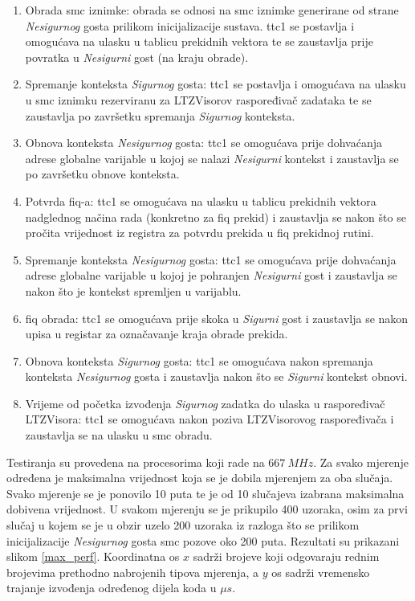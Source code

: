 \documentclass[times, utf8, diplomski, numeric]{fer}
\begin{document}
\begin{enumerate}
  \item{Obrada \gls{smc} iznimke: obrada se odnosi na \gls{smc} iznimke generirane od strane \textit{Nesigurnog} gosta prilikom
  inicijalizacije sustava. \gls{ttc}1 se postavlja i omogućava na ulasku u tablicu prekidnih vektora te se zaustavlja prije
  povratka u \textit{Nesigurni} gost (na kraju obrade).}
  \item{Spremanje konteksta \textit{Sigurnog} gosta: \gls{ttc}1 se postavlja i omogućava na ulasku u \gls{smc} iznimku rezerviranu
  za LTZVisorov raspoređivač zadataka te se zaustavlja po završetku spremanja \textit{Sigurnog} konteksta.}
  \item{Obnova konteksta \textit{Nesigurnog} gosta: \gls{ttc}1 se omogućava prije dohvaćanja adrese globalne varijable u kojoj
  se nalazi \textit{Nesigurni} kontekst i zaustavlja se po završetku obnove konteksta.}
  \item{Potvrda \gls{fiq}-a: \gls{ttc}1 se omogućava na ulasku u tablicu prekidnih vektora nadglednog načina rada (konkretno za
  \gls{fiq} prekid) i zaustavlja se nakon što se pročita vrijednost iz registra za potvrdu prekida u \gls{fiq} prekidnoj rutini.}
  \item{Spremanje konteksta \textit{Nesigurnog} gosta: \gls{ttc}1 se omogućava prije dohvaćanja adrese globalne varijable u kojoj
  je pohranjen \textit{Nesigurni} gost i zaustavlja se nakon što je kontekst spremljen u varijablu.}
  \item{\gls{fiq} obrada: \gls{ttc}1 se omogućava prije skoka u \textit{Sigurni} gost i zaustavlja se nakon upisa u registar za
  označavanje kraja obrade prekida.}
  \item{Obnova konteksta \textit{Sigurnog} gosta: \gls{ttc}1 se omogućava nakon spremanja konteksta \textit{Nesigurnog} gosta
  i zaustavlja nakon što se \textit{Sigurni} kontekst obnovi.}
  \item{Vrijeme od početka izvođenja \textit{Sigurnog} zadatka do ulaska u raspoređivač LTZVisora: \gls{ttc}1 se omogućava
  nakon poziva LTZVisorovog raspoređivača i zaustavlja se na ulasku u \gls{smc} obradu.}
\end{enumerate}
Testiranja su provedena na procesorima koji rade na $667~MHz$. Za svako mjerenje određena je maksimalna vrijednost
koja se je dobila mjerenjem za oba slučaja. Svako mjerenje se je ponovilo 10 puta te je od 10 slučajeva izabrana
maksimalna dobivena vrijednost. U svakom mjerenju se je prikupilo 400 uzoraka, osim za prvi slučaj u kojem se je u
obzir uzelo 200 uzoraka iz razloga što se prilikom inicijalizacije \textit{Nesigurnog} gosta \gls{smc} pozove oko 200 puta.
Rezultati su prikazani slikom \ref{max_perf}. Koordinatna
os $x$ sadrži brojeve koji odgovaraju rednim brojevima prethodno nabrojenih tipova mjerenja, a $y$ os sadrži vremensko
trajanje izvođenja određenog dijela koda u $\mu s$.
\end{document}
